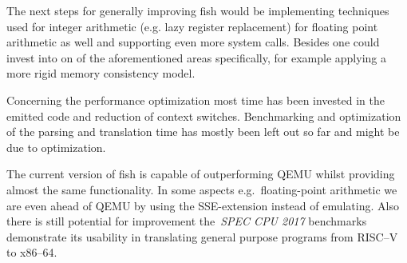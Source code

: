 The next steps for generally improving fish would be implementing techniques used for integer arithmetic (e.g. lazy register replacement) for floating point arithmetic as well and supporting even more system calls.
Besides one could invest into on of the aforementioned areas specifically, for example applying a more rigid memory consistency model.

Concerning the performance optimization most time has been invested in the emitted code and reduction of context switches.
Benchmarking and optimization of the parsing and translation time has mostly been left out so far and might be due to optimization.


The current version of fish is capable of outperforming QEMU whilst providing almost the same functionality.
In some aspects e.g.\ floating-point arithmetic we are even ahead of QEMU by using the SSE-extension instead of emulating.
Also there is still potential for improvement the~\textit{SPEC CPU 2017} benchmarks demonstrate its usability in translating general purpose programs from RISC--V to x86--64.